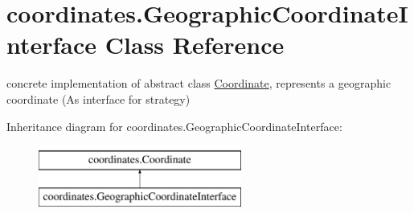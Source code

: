 \hypertarget{classcoordinates_1_1_geographic_coordinate_interface}{}\section{coordinates.\+Geographic\+Coordinate\+Interface Class Reference}
\label{classcoordinates_1_1_geographic_coordinate_interface}


concrete implementation of abstract class \hyperlink{classcoordinates_1_1_coordinate}{Coordinate}, represents a geographic coordinate (As interface for strategy)~\newline
  


Inheritance diagram for coordinates.\+Geographic\+Coordinate\+Interface\+:\begin{figure}[H]
\begin{center}
\leavevmode
\includegraphics[height=2.000000cm]{classcoordinates_1_1_geographic_coordinate_interface}
\end{center}
\end{figure}
